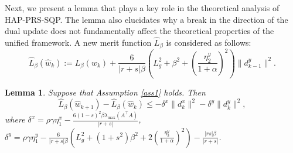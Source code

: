 \documentclass[pdflatex,sn-mathphys-num]{sn-jnl}%
\theoremstyle{thmstyleone}%
\newtheorem{lemma}{Lemma}
\theoremstyle{thmstyletwo}%
\theoremstyle{thmstylethree}%
\begin{document}
Next, we present a lemma that plays a key role in the theoretical analysis of HAP-PRS-SQP. The lemma also elucidates why a break in the direction of the dual update does not fundamentally affect the theoretical properties of the unified framework. A new merit function $\hat{L}_{\beta}$ is considered as follows:
\[\hat{L}_{\beta}(\hat{w}_k):={L}_{\beta}(w_k)+\frac{6}{|r+s|\beta}\left(L_g^2+\beta ^2+(\frac{\eta_2^y}{1+\alpha})^2\right)\|d^y_{k-1}\|^2.\]

\begin{lemma}\label{lem3}
	Suppose that Assumption \ref{ass1} holds. Then
	\[\hat{L}_{\beta}(\hat{w}_{k+1})-\hat{L}_{\beta}(\hat{w}_{k}) \leq -\delta^x\|d_{k}^x\|^2-\delta^y\|d_{k}^y\|^2,\]
	where $\delta^x=\rho\gamma\eta^x_1-\frac{6(1-s)^2\beta\lambda_{\max}(A^{\top}A)}{|r+s|}$, $\delta^y =\rho\gamma\eta^y_1 -\frac{6}{|r+s|\beta}\left(L_{g}^{2}+(1+s^{2})\beta^{2}+2\left(\frac{\eta_2^y}{1+\alpha}\right)^2\right)-\frac{|rs|\beta}{|r+s|}$.
\end{lemma}
\end{document}
